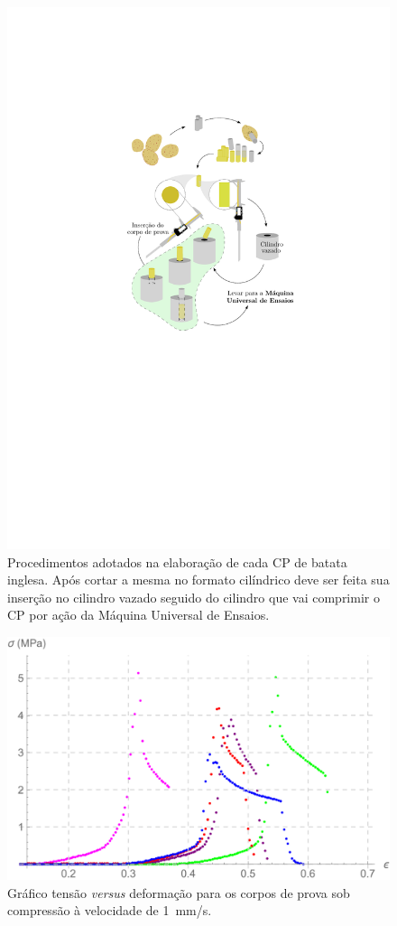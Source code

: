 \documentclass[a4paper, 12pt]{article}
\begin{document}
	\begin{figure}
		\label{diagram}
		\centering
		\includegraphics[scale=1.1]{images/diagram}
		\caption{Procedimentos adotados na elaboração de cada CP de batata inglesa. Após cortar a mesma no formato cilíndrico deve ser feita sua inserção no cilindro vazado seguido do cilindro que vai comprimir o CP por ação da Máquina Universal de Ensaios.}
	\end{figure}

	\begin{figure}
		\label{graph}
		\centering
		\includegraphics[scale=.6]{images/graph}
		\caption{Gráfico tensão \textit{versus} deformação para os corpos de prova sob compressão à velocidade de \SI{1}{\milli\meter/\second}.}
	\end{figure}
	
\end{document}

